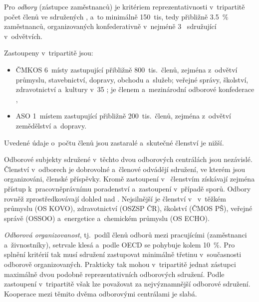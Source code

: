 Pro \textit{odbory} (zástupce zaměstnanců) je kritériem reprezentativnosti v~tripartitě počet členů ve sdružených , a~to minimálně 150~tis, tedy přibližně \SI{3.5}{\percent} zaměstnanců, organizovaných konfederativně v~nejméně 3~ sdružující  v~odvětvích.\par
Zastoupeny v~tripartitě jsou:
\begin{itemize}[noitemsep]
    \item \acf{ČMKOS} 6~místy zastupující přibližně 800~tis.~členů, zejména z~odvětví průmyslu, stavebnictví, dopravy, obchodu a~služeb; veřejné správy, školství, zdravotnictví a~kultury v~35 ; je členem  a~mezinárodní odborové konfederace ,
    \item \acf{ASO} 1~místem zastupující přibližně 200~tis.~členů, zejména z~odvětví zemědělství a~dopravy.
\end{itemize}
Uvedené údaje o~počtu členů jsou zastaralé a~skutečné členství je nižší.~\cite{RHSD_CR}\par
Odborové subjekty sdružené v~těchto dvou odborových centrálách jsou nezávislé. Členství v~odborech je dobrovolné a~členové odvádějí sdružení, ve kterém jsou organizováni, členské příspěvky. Kromě zastoupení v~ členstvím získávají zejména přístup k~pracovněprávnímu poradenství a~zastoupení v~případě sporů. Odbory rovněž zprostředkovávají dohled nad . Nejsilnější je členství v~ v~těžkém průmyslu (\acs{OS KOVO}), zdravotnictví (\acs{OSZSP ČR}), školství (\acs{ČMOS PŠ}), veřejné správě (\acs{OSSOO}) a~energetice a~chemickém průmyslu (\acs{OS ECHO}).\par
\textit{Odborová organizovanost}, tj.~podíl členů odborů mezi pracujícími (zaměstnanci a~živnostníky), setrvale klesá a~podle \ac{OECD} se pohybuje kolem \SI{10}{\percent}. Pro splnění kritérií tak musí sdružení zastupovat minimálně třetinu v~současnosti odborově organizovaných. Prakticky tak mohou v~tripartitě jednat zástupci maximálně dvou podobně reprezentativních odborových sdružení. Podle zastoupení v~tripartitě však lze  považovat za nejvýznamnější odborové sdružení. Kooperace mezi těmito dvěma odborovými centrálami je slabá.~\cite{Eurofound_CZ_Actors2024}\par


